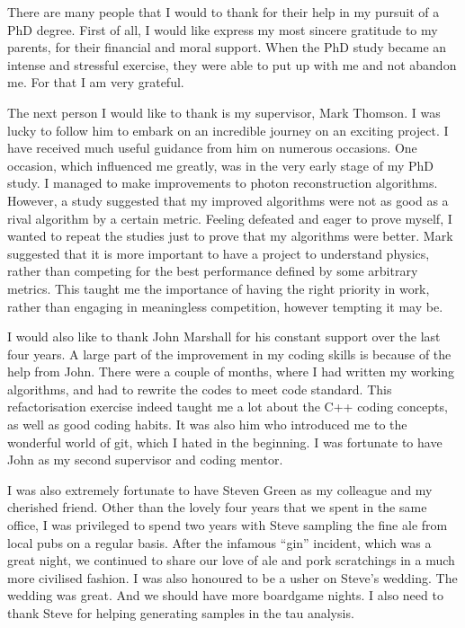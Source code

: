 \begin{acknowledgements}
There are many people that I would to thank  for their help in my pursuit of a PhD degree. First of all, I would like express my most sincere gratitude to my parents, for their financial and moral support. When the PhD study became an intense and stressful exercise, they were able to put up with me and not abandon me. For that I am very grateful.



The next person I would like to thank is my supervisor, Mark Thomson. I was lucky to follow him to embark on an incredible journey on an exciting project. I have received much useful guidance from him on numerous occasions. One occasion, which influenced me greatly, was in the very early stage of my PhD study. I managed to make improvements to photon reconstruction algorithms. However, a study suggested that my improved algorithms were not as good as a rival algorithm by a certain metric. Feeling defeated and eager to prove myself, I wanted to repeat the studies just to prove that my algorithms were better. Mark suggested that it is more important to have a project to understand physics, rather than competing for the best performance defined by some arbitrary metrics. This taught me the importance of having the right priority in work, rather than engaging in meaningless competition, however tempting it may be.

I would also like to thank John Marshall for his constant support over the last four years. A large part of the improvement in my coding skills is because of the help from John. There were a couple of months, where I had written my working algorithms, and had to rewrite the codes to meet \pandora code standard. This refactorisation exercise indeed taught me a lot about the C++ coding concepts, as well as good coding habits. It was also him who introduced me to the wonderful world of git, which I hated in the beginning. I was fortunate to have John as my second supervisor and coding mentor.

I was also extremely fortunate to have Steven Green as my colleague and my cherished friend. Other than the lovely four years that we spent in the same office,   I was privileged to spend two years with Steve sampling the fine ale from local pubs on a regular basis. After the infamous ``gin'' incident, which was a great night, we continued to share our love of ale and pork scratchings in a much more civilised fashion. I was also honoured to be a usher on Steve's wedding. The wedding was great. And we should have more boardgame nights. I also need to thank Steve for helping generating samples in the tau analysis.


\end{acknowledgements}
